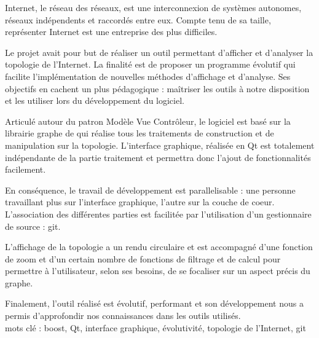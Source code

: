 \par
Internet, le réseau des réseaux, est une interconnexion de systèmes autonomes, réseaux indépendents et raccordés entre eux. Compte tenu de sa taille, représenter Internet est une entreprise des plus difficiles.

Le projet avait pour but de réaliser un outil permettant d'afficher et d'analyser la topologie de l'Internet. La finalité est de proposer un programme évolutif qui facilite l'implémentation de nouvelles méthodes d'affichage et d'analyse. Ses objectifs en cachent un plus pédagogique : maîtriser les outils à notre disposition et les utiliser lors du développement du logiciel.

Articulé autour du patron Modèle Vue Contrôleur, le logiciel est basé sur la librairie graphe de \boost qui réalise tous les traitements de construction et de manipulation sur la topologie. L'interface graphique, réalisée en Qt est totalement indépendante de la partie traitement et permettra donc l'ajout de fonctionnalités facilement.

En cons\'equence, le travail de d\'eveloppement est parallelisable : une personne travaillant plus sur l'interface graphique, l'autre sur la couche de coeur. L'association des diff\'erentes parties est facilit\'ee par l'utilisation d'un gestionnaire de source : git.

L'affichage de la topologie a un rendu circulaire et est accompagné d'une fonction de zoom et d'un certain nombre de fonctions de filtrage et de calcul pour permettre à l'utilisateur, selon ses besoins, de se focaliser sur un aspect précis du graphe.

Finalement, l'outil r\'ealis\'e est \'evolutif, performant et son d\'eveloppement nous a permis d'approfondir nos connaissances dans les outils utilis\'es.\\

mots cl\'e : boost, Qt, interface graphique, évolutivité, topologie de l'Internet, git







